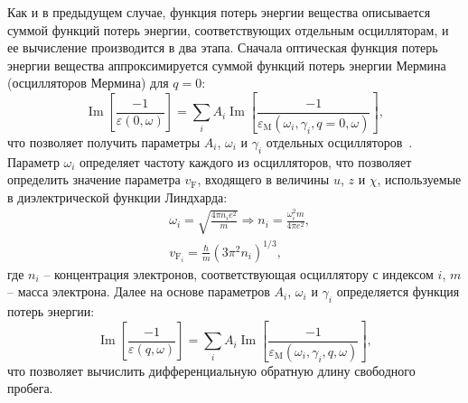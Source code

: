 Как и в предыдущем случае, функция потерь энергии вещества описывается суммой функций потерь энергии, соответствующих отдельным осцилляторам, и ее вычисление производится в два этапа. Сначала оптическая функция потерь энергии вещества аппроксимируется суммой функций потерь энергии Мермина (осцилляторов Мермина) для $q=0$:
\begin{equation}
	\operatorname{Im}\left[\frac{-1}{\varepsilon(0, \omega)}\right]=\sum_i A_i \operatorname{Im}\left[\frac{-1}{\varepsilon_\mathrm{M}\left(\omega_i, \gamma_i, q=0, \omega\right)}\right],
\end{equation}
что позволяет получить параметры $A_i$, $\omega_i$ и $\gamma_i$ отдельных осцилляторов~\cite{DeVera_MELF_params}. Параметр $\omega_i$ определяет частоту каждого из осцилляторов, что позволяет определить значение параметра $v_\mathrm{F}$, входящего в величины $u$, $z$ и $\chi$, используемые в диэлектрической функции Линдхарда:
\begin{equation}
	\begin{aligned}
		&\omega_i=\sqrt{\frac{4 \pi n_i e^2}{m}} \Rightarrow n_i=\frac{\omega_i^2 m}{4 \pi e^2}, \\
		&v_{\mathrm{F}_i}=\frac{\hbar}{m}\left(3 \pi^2 n_i\right)^{1/3},
	\end{aligned}
\end{equation}
где $n_i$ -- концентрация электронов, соответствующая осциллятору с индексом $i$, $m$ -- масса электрона. Далее на основе параметров $A_i$, $\omega_i$ и $\gamma_i$ определяется функция потерь энергии:
\begin{equation}
	\operatorname{Im}\left[\frac{-1}{\varepsilon(q, \omega)}\right]=\sum_i A_i \operatorname{Im}\left[\frac{-1}{\varepsilon_\mathrm{M}\left(\omega_i, \gamma_i, q, \omega\right)}\right],
\end{equation}
что позволяет вычислить дифференциальную обратную длину свободного пробега.
